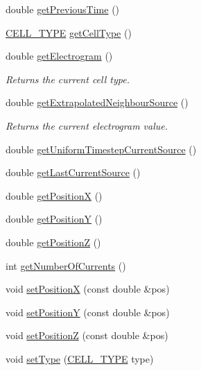 \begin{DoxyCompactItemize}
double \hyperlink{class_oscillator_a0768ee28a72db7e13e14fb717408292c}{get\+Previous\+Time} ()
\item 
\hyperlink{heart_defines_8h_a2f059cd81f362503874790462d535f5b}{C\+E\+L\+L\+\_\+\+T\+Y\+P\+E} \hyperlink{class_oscillator_aa0ae5ca40fa136d70b145d490646b8aa}{get\+Cell\+Type} ()
\item 
double \hyperlink{class_oscillator_a2eb50a29aeac6a63b4b8212d1b4cc097}{get\+Electrogram} ()
\begin{DoxyCompactList}\small\item\em Returns the current cell type. \end{DoxyCompactList}\item 
double \hyperlink{class_oscillator_a5051ab41b5036cb775faaa5f97e2c182}{get\+Extrapolated\+Neighbour\+Source} ()
\begin{DoxyCompactList}\small\item\em Returns the current electrogram value. \end{DoxyCompactList}\item 
double \hyperlink{class_oscillator_a38ec1c04097cceea46f4712fca7169e2}{get\+Uniform\+Timestep\+Current\+Source} ()
\item 
double \hyperlink{class_oscillator_ae0af6d579f485bc7ffbff790c145b388}{get\+Last\+Current\+Source} ()
\item 
double \hyperlink{class_oscillator_ad2be11901d2b0055a48890643db3350d}{get\+Position\+X} ()
\item 
double \hyperlink{class_oscillator_aaa999e4824d4e4007c0541ae78f60e6c}{get\+Position\+Y} ()
\item 
double \hyperlink{class_oscillator_a6f21f66ca4ca7a163d6b3d84eda3b8db}{get\+Position\+Z} ()
\item 
int \hyperlink{class_oscillator_a115350abaf2f6ddbf9c06027b8faa1e6}{get\+Number\+Of\+Currents} ()
\item 
void \hyperlink{class_oscillator_a672b578b643936b3b0b42371b6d339d9}{set\+Position\+X} (const double \&pos)
\item 
void \hyperlink{class_oscillator_aecfc7c140beecd6a82ab6d414892632d}{set\+Position\+Y} (const double \&pos)
\item 
void \hyperlink{class_oscillator_a597c5025182c90571804c6dc81f33e70}{set\+Position\+Z} (const double \&pos)
\item 
void \hyperlink{class_oscillator_acdee83b452a76ee20b48248cd4ba45cc}{set\+Type} (\hyperlink{heart_defines_8h_a2f059cd81f362503874790462d535f5b}{C\+E\+L\+L\+\_\+\+T\+Y\+P\+E} type)
\item 

\end{DoxyCompactItemize}
